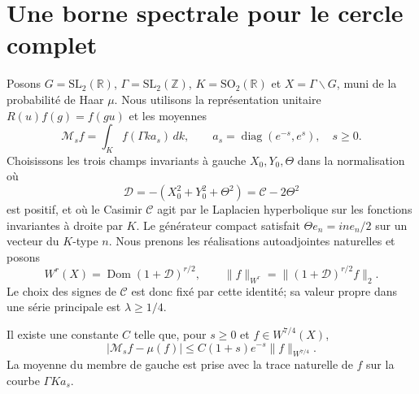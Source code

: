 \section{Une borne spectrale pour le cercle complet}

Posons $G=\mathrm{SL}_2(\mathbb R)$, $\Gamma=\mathrm{SL}_2(\mathbb Z)$,
$K=\mathrm{SO}_2(\mathbb R)$ et $X=\Gamma\backslash G$, muni de la
probabilité de Haar $\mu$. Nous utilisons la représentation unitaire
$R(u)f(g)=f(gu)$ et les moyennes
\[
 \mathcal M_s f=\int_K f(\Gamma k a_s)\,dk,
 \qquad a_s=\operatorname{diag}(e^{-s},e^s),\quad s\ge0.
\]
Choisissons les trois champs invariants à gauche $X_0,Y_0,\Theta$ dans
la normalisation où
\[
 \mathcal D=-(X_0^2+Y_0^2+\Theta^2)=\mathcal C-2\Theta^2
\]
est positif, et où le Casimir $\mathcal C$ agit par le Laplacien
hyperbolique sur les fonctions invariantes à droite par $K$. Le générateur
compact satisfait $\Theta e_n=in e_n/2$ sur un vecteur du $K$-type $n$.
Nous prenons les réalisations autoadjointes naturelles et posons
\[
 W^r(X)=\operatorname{Dom}(1+\mathcal D)^{r/2},\qquad
 \|f\|_{W^r}=\|(1+\mathcal D)^{r/2}f\|_2.
\]
Le choix des signes de $\mathcal C$ est donc fixé par cette identité;
sa valeur propre dans une série principale est $\lambda\ge1/4$.

\begin{proposition}
Il existe une constante $C$ telle que, pour $s\ge0$ et $f\in W^{7/4}(X)$,
\[
 |\mathcal M_s f-\mu(f)|
 \le C(1+s)e^{-s}\|f\|_{W^{7/4}}.
 \tag{S1}
\]
La moyenne du membre de gauche est prise avec la trace naturelle de $f$
sur la courbe $\Gamma K a_s$.
\end{proposition}


